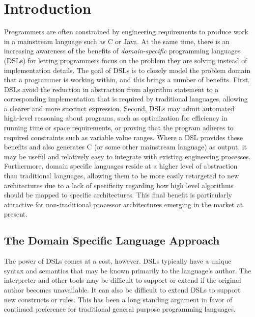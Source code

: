 
\section{Introduction}

Programmers are often constrained by engineering requirements to produce work
in a mainstream language such as C or Java. At the same time, there is an
increasing awareness of the benefits of \emph{domain-specific} programming
languages (DSLs) for letting programmers focus on the problem they are solving
instead of implementation details. The goal of DSLs is to closely model the
problem domain that a programmer is working within, and this brings a number
of benefits. First, DSLs avoid the reduction in abstraction from algorithm
statement to a corresponding implementation that is required by traditional
languages, allowing a clearer and more succinct expression. Second, DSLs may
admit automated high-level reasoning about programs, such as optimization for
efficiency in running time or space requirements, or proving that the program
adheres to required constraints such as variable value ranges. Where a DSL
provides these benefits and also generates C (or some other mainstream
language) as output, it may be useful and relatively easy to integrate with
existing engineering processes. Furthermore, domain specific languages reside
at a higher level of abstraction than traditional languages, allowing them to
be more easily retargeted to new architectures due to a lack of specificity
regarding how high level algorithms should be mapped to specific
architectures. This final benefit is particularly attractive for
non-traditional processor architectures emerging in the market at present.

\subsection{The Domain Specific Language Approach}

The power of DSLs comes at a cost, however. DSLs typically have a unique
syntax and semantics that may be known primarily to the language's author. The
interpreter and other tools may be difficult to support or extend if the
original author becomes unavailable. It can also be difficult to extend DSLs
to support new constructs or rules. This has been a long standing argument in
favor of continued preference for traditional general purpose programming
languages.



